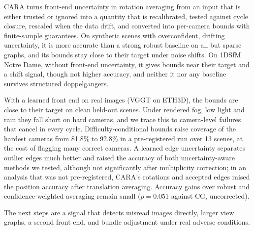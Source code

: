 CARA turns front-end uncertainty in rotation averaging from an input that is either trusted or ignored into a quantity that is recalibrated, tested against cycle closure, rescaled when the data drift, and converted into per-camera bounds with finite-sample guarantees. On synthetic scenes with overconfident, drifting uncertainty, it is more accurate than a strong robust baseline on all but sparse graphs, and its bounds stay close to their target under noise shifts. On 1DSfM Notre Dame, without front-end uncertainty, it gives bounds near their target and a shift signal, though not higher accuracy, and neither it nor any baseline survives structured doppelgangers.

With a learned front end on real images (VGGT on ETH3D), the bounds are close to their target on clean held-out scenes. Under rendered fog, low light and rain they fall short on hard cameras, and we trace this to camera-level failures that cancel in every cycle. Difficulty-conditional bounds raise coverage of the hardest cameras from 81.8\% to 92.8\% in a pre-registered run over 13 scenes, at the cost of flagging many correct cameras. A learned edge uncertainty separates outlier edges much better and raised the accuracy of both uncertainty-aware methods we tested, although not significantly after multiplicity correction; in an analysis that was not pre-registered, CARA's rotations and accepted edges raised the position accuracy after translation averaging. Accuracy gains over robust and confidence-weighted averaging remain small ($p=0.051$ against CG, uncorrected).

The next steps are a signal that detects misread images directly, larger view graphs, a second front end, and bundle adjustment under real adverse conditions.
